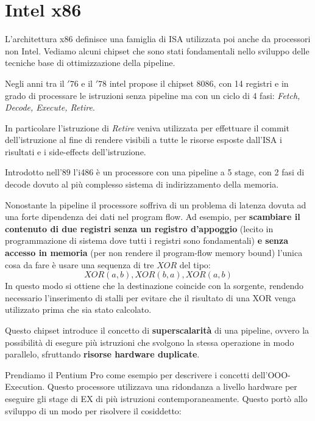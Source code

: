 \section{Intel x86}\label{sec:x86pipe}
L'architettura x86 definisce una famiglia di ISA utilizzata poi anche da processori non Intel. Vediamo alcuni chipset che sono stati fondamentali nello sviluppo delle tecniche base di ottimizzazione della pipeline.
\begin{example}[Intel 8086]\label{ex:8086}
    Negli anni tra il $'76$ e il $'78$ intel propose il chipset 8086, con 14 registri e in grado di processare le istruzioni senza pipeline ma con un ciclo di 4 fasi: \textit{Fetch, Decode, Execute, Retire}.

    In particolare l'istruzione di \textit{Retire} veniva utilizzata per effettuare il commit dell'istruzione al fine di rendere visibili a tutte le risorse esposte dall'ISA i risultati e i side-effects dell'istruzione.
\end{example}
\begin{example}[Intel 80486 - i486]\label{ex:i486}
    Introdotto nell'$89$ l'i486 è un processore con una pipeline a 5 stage, con 2 fasi di decode dovuto al più complesso sistema di indirizzamento della memoria.

    Nonostante la pipeline il processore soffriva di un problema di latenza dovuta ad una forte dipendenza dei dati nel program flow. Ad esempio, per \textbf{scambiare il contenuto di due registri senza un registro d'appoggio} (lecito in programmazione di sistema dove tutti i registri sono fondamentali) \textbf{e senza accesso in memoria} (per non rendere il program-flow memory bound) l'unica cosa da fare è usare una sequenza di tre $XOR$ del tipo: 
    \[
        XOR(a,b), XOR(b,a), XOR(a,b)
    \]
    In questo modo si ottiene che la destinazione coincide con la sorgente, rendendo necessario l'inserimento di stalli per evitare che il risultato di una XOR venga utilizzato prima che sia stato calcolato.
\end{example}
\begin{example}\label{ex:pentiumpro}
     Questo chipset introduce il concetto di \textbf{superscalarità} di una pipeline, ovvero la possibilità di esegure più istruzioni che svolgono la stessa operazione in modo parallelo, sfruttando \textbf{risorse hardware duplicate}. 
\end{example}
Prendiamo il Pentium Pro come esempio per descrivere i concetti dell'OOO-Execution. Questo processore utilizzava una ridondanza a livello hardware per eseguire gli stage di EX di più istruzioni contemporaneamente. Questo portò allo sviluppo di un modo per risolvere il cosiddetto:
